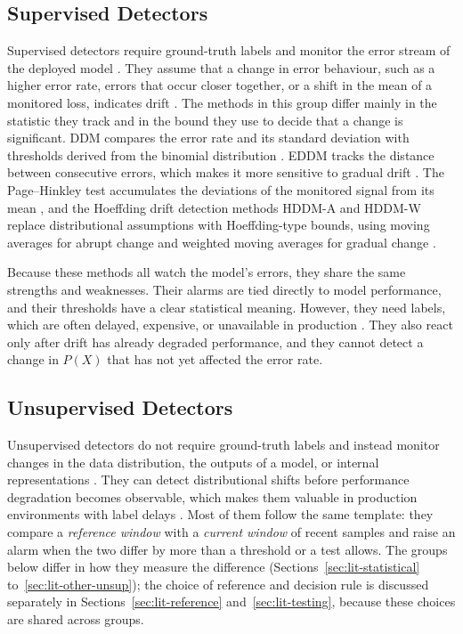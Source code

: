 \subsection{Supervised Detectors}
Supervised detectors require ground-truth labels and monitor the error stream of the deployed model \citep{Gama2014, Gama2004}. They assume that a change in error behaviour, such as a higher error rate, errors that occur closer together, or a shift in the mean of a monitored loss, indicates drift \citep{Gama2004, BaenaGarcia2006}. The methods in this group differ mainly in the statistic they track and in the bound they use to decide that a change is significant. DDM compares the error rate and its standard deviation with thresholds derived from the binomial distribution \citep{Gama2004}. EDDM tracks the distance between consecutive errors, which makes it more sensitive to gradual drift \citep{BaenaGarcia2006}. The Page--Hinkley test accumulates the deviations of the monitored signal from its mean \citep{Page1954}, and the Hoeffding drift detection methods HDDM-A and HDDM-W replace distributional assumptions with Hoeffding-type bounds, using moving averages for abrupt change and weighted moving averages for gradual change \citep{FriasBlanco2015}.

Because these methods all watch the model's errors, they share the same strengths and weaknesses. Their alarms are tied directly to model performance, and their thresholds have a clear statistical meaning. However, they need labels, which are often delayed, expensive, or unavailable in production \citep{Lu2018, Sethi2017}. They also react only after drift has already degraded performance, and they cannot detect a change in $P(X)$ that has not yet affected the error rate.

\subsection{Unsupervised Detectors}
Unsupervised detectors do not require ground-truth labels and instead monitor changes in the data distribution, the outputs of a model, or internal representations \citep{Tsymbal2004, Hinder2024}. They can detect distributional shifts before performance degradation becomes observable, which makes them valuable in production environments with label delays \citep{Sethi2017}. Most of them follow the same template: they compare a \emph{reference window} with a \emph{current window} of recent samples and raise an alarm when the two differ by more than a threshold or a test allows. The groups below differ in how they measure the difference (Sections~\ref{sec:lit-statistical} to~\ref{sec:lit-other-unsup}); the choice of reference and decision rule is discussed separately in Sections~\ref{sec:lit-reference} and~\ref{sec:lit-testing}, because these choices are shared across groups.

